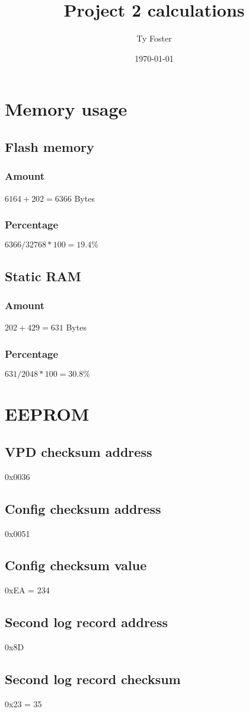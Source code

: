 \documentclass[12pt]{article}
\title{Project 2 calculations}
\author{Ty Foster}
\date{\today}
\begin{document}
\maketitle
\section*{Memory usage}
\subsection*{Flash memory}
\subsubsection*{Amount}
$ 6164 + 202 = 6366 $ Bytes
\subsubsection*{Percentage}
$ 6366 / 32768 * 100 = 19.4\% $
\subsection*{Static RAM}
\subsubsection*{Amount}
$ 202 + 429 = 631 $ Bytes
\subsubsection*{Percentage}
$ 631 / 2048 * 100 = 30.8\% $
\section*{EEPROM}
\subsection*{VPD checksum address}
0x0036
\subsection*{Config checksum address}
0x0051
\subsection*{Config checksum value}
0xEA = 234
\subsection*{Second log record address}
0x8D
\subsection*{Second log record checksum}
0x23 = 35
\end{document}
